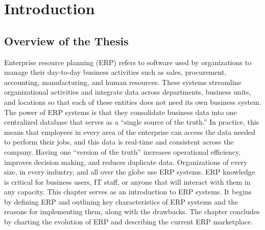 \chapter{Introduction}

\section{Overview of the Thesis}
Enterprise resource planning (ERP) refers to software used by
organizations to manage their day-to-day business activities such as
sales, procurement, accounting, manufacturing, and human
resources. These systems streamline organizational activities and
integrate data across departments, business units, and locations so
that each of these entities does not need its own business system.
The power of ERP systems is that they consolidate business data
into one centralized database that serves as a “single source of the
truth.” In practice, this means that employees in every area of the
enterprise can access the data needed to perform their jobs, and this
data is real-time and consistent across the company. Having one
“version of the truth” increases operational efficiency, improves
decision making, and reduces duplicate data. Organizations of every
size, in every industry, and all over the globe use ERP systems. ERP
knowledge is critical for business users, IT staff, or anyone that will
interact with them in any capacity. This chapter serves as an
introduction to ERP systems. It begins by defining ERP and outlining
key characteristics of ERP systems and the reasons for implementing
them, along with the drawbacks. The chapter concludes by charting
the evolution of ERP and describing the current ERP marketplace.